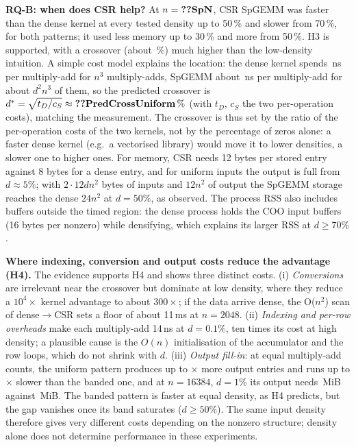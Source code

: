 \documentclass[conference,a4paper]{IEEEtran}
\begin{document}
\textbf{RQ-B: when does CSR help?} At $n=\val{SpN}$, CSR SpGEMM was faster than the dense kernel at every
tested density up to 50\,\% and slower from 70\,\%, for both patterns; it used less memory up to 30\,\% and
more from 50\,\%. H3 is supported, with a crossover (about \,\%) much higher than
the low-density intuition. A simple cost model explains the location: the dense kernel spends
\,ns per multiply-add for $n^3$ multiply-adds, SpGEMM about \,ns
per multiply-add for about $d^2n^3$ of them, so the predicted crossover is
$d^\ast=\sqrt{t_D/c_S}\approx\val{PredCrossUniform}\,\%$ (with $t_D$, $c_S$ the two per-operation
costs), matching the measurement. The crossover is thus set
by the ratio of the per-operation costs of the two kernels, not by the percentage of zeros alone: a faster
dense kernel (e.g.\ a vectorised library) would move it to lower densities, a slower one to higher ones.
For memory, CSR needs 12 bytes per stored entry against 8 bytes for a dense entry, and for uniform inputs
the output is full from $d\approx 5\%$; with $2\cdot 12dn^2$ bytes of inputs and $12n^2$ of output the
SpGEMM storage reaches the dense $24n^2$ at $d=50\%$, as observed. The process RSS also includes buffers
outside the timed region: the dense process holds the COO input buffers (16 bytes per nonzero) while
densifying, which explains its larger RSS at $d\ge 70\%$.

\textbf{Where indexing, conversion and output costs reduce the advantage (H4).} The evidence supports H4 and
shows three distinct costs. (i) \emph{Conversions} are irrelevant near the crossover but dominate at low
density, where they reduce a $10^4\times$ kernel advantage to about $300\times$; if the data arrive dense, the
O($n^2$) scan of dense$\to$CSR sets a floor of about 11\,ms at $n=2048$. (ii) \emph{Indexing and per-row
overheads} make each multiply-add 14\,ns at $d=0.1\%$, ten times its cost at high density; a plausible cause
is the $O(n)$ initialisation of the accumulator and the row loops, which do not shrink with $d$.
(iii) \emph{Output fill-in}: at equal multiply-add counts, the uniform pattern produces up to
$\times$ more output entries and runs up to $\times$ slower than the
banded one, and at $n=16384$, $d=1\%$ its output needs \,MiB against
\,MiB. The banded pattern is faster at equal density, as H4 predicts, but the gap
vanishes once its band saturates ($d\ge 50\%$). The same input density therefore gives very different costs
depending on the nonzero structure; density alone does not determine performance in these experiments.
\end{document}
